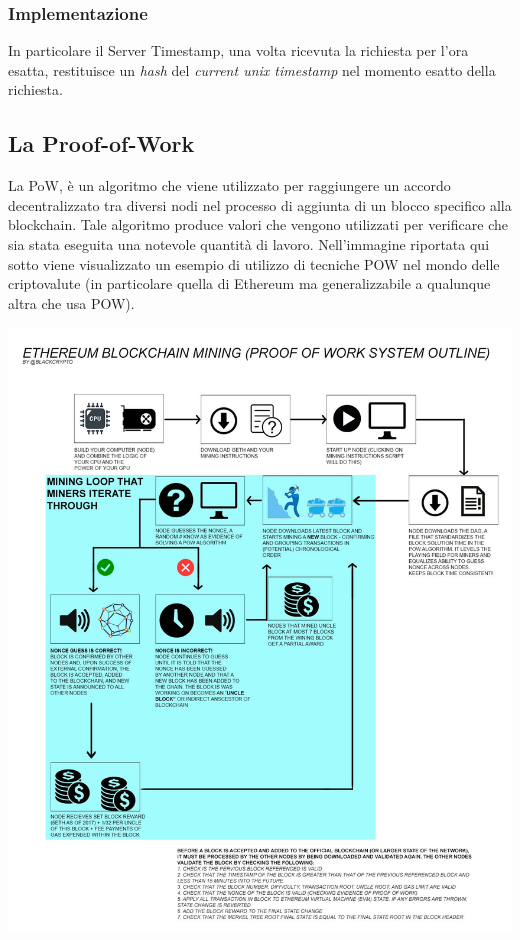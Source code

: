 \subsubsection{Implementazione}
In particolare il Server Timestamp, una volta ricevuta la richiesta per l'ora esatta, restituisce un \textit{hash} del \textit{current unix timestamp} nel momento esatto della richiesta.

\subsection{La Proof-of-Work}
La PoW, è un algoritmo che viene utilizzato per raggiungere un accordo decentralizzato tra diversi nodi nel processo di aggiunta di un blocco specifico alla blockchain.
Tale algoritmo produce valori che vengono utilizzati per verificare che sia stata eseguita una notevole quantità di lavoro. Nell'immagine riportata qui sotto viene visualizzato un esempio di utilizzo di tecniche POW nel mondo delle criptovalute (in particolare quella di Ethereum ma generalizzabile a qualunque altra che usa POW).
\begin{center}
    \includegraphics[width=\linewidth]{img/pow}
\end{center}

